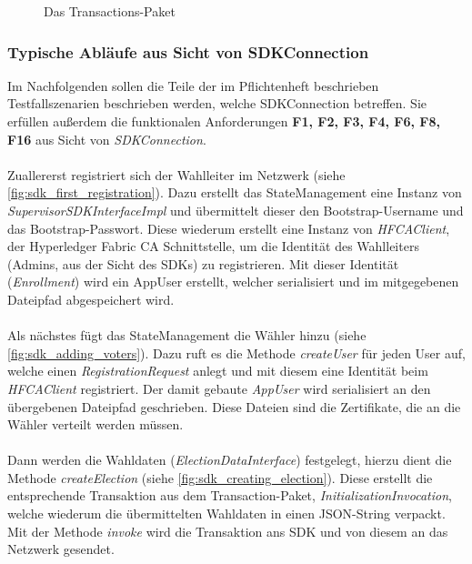 \documentclass[parskip=full]{scrartcl}
\begin{document}
	\newpage
	\begin{figure}
		\centering
		\hspace{-100pt}
		\centerline{}
		\caption{Das Transactions-Paket}
		\label{fig:sdk_transaction}
	\end{figure}
	\thispagestyle{empty}
	\subsubsection{Typische Abläufe aus Sicht von SDKConnection}
	Im Nachfolgenden sollen die Teile der im Pflichtenheft beschrieben Testfallszenarien beschrieben werden, welche SDKConnection betreffen. Sie erfüllen außerdem die funktionalen Anforderungen \textbf{F1, F2, F3, F4, F6, F8, F16} aus Sicht von \textit{SDKConnection}.
	\\ \\ 
	Zuallererst registriert sich der Wahlleiter im Netzwerk (siehe \autoref{fig:sdk_first_registration}). Dazu erstellt das StateManagement eine Instanz von \textit{SupervisorSDKInterfaceImpl} und übermittelt dieser den Bootstrap-Username und das Bootstrap-Passwort. Diese wiederum erstellt eine Instanz von \textit{HFCAClient}, der Hyperledger Fabric CA Schnittstelle, um die Identität des Wahlleiters (Admins, aus der Sicht des SDKs) zu registrieren. Mit dieser Identität (\textit{Enrollment}) wird ein AppUser erstellt, welcher serialisiert und im mitgegebenen Dateipfad abgespeichert wird.
	\\ \\
	Als nächstes fügt das StateManagement die Wähler hinzu (siehe \autoref{fig:sdk_adding_voters}). Dazu ruft es die Methode \textit{createUser} für jeden User auf, welche einen \textit{RegistrationRequest} anlegt und mit diesem eine Identität beim \textit{HFCAClient} registriert. Der damit gebaute \textit{AppUser} wird serialisiert an den übergebenen Dateipfad geschrieben. Diese Dateien sind die Zertifikate, die an die Wähler verteilt werden müssen.
	\\ \\
	Dann werden die Wahldaten (\textit{ElectionDataInterface}) festgelegt, hierzu dient die Methode \textit{createElection} (siehe \autoref{fig:sdk_creating_election}). Diese erstellt die entsprechende Transaktion aus dem Transaction-Paket, \textit{InitializationInvocation}, welche wiederum die übermittelten Wahldaten in einen JSON-String verpackt. Mit der Methode \textit{invoke} wird die Transaktion ans SDK und von diesem an das Netzwerk gesendet.
\end{document}
